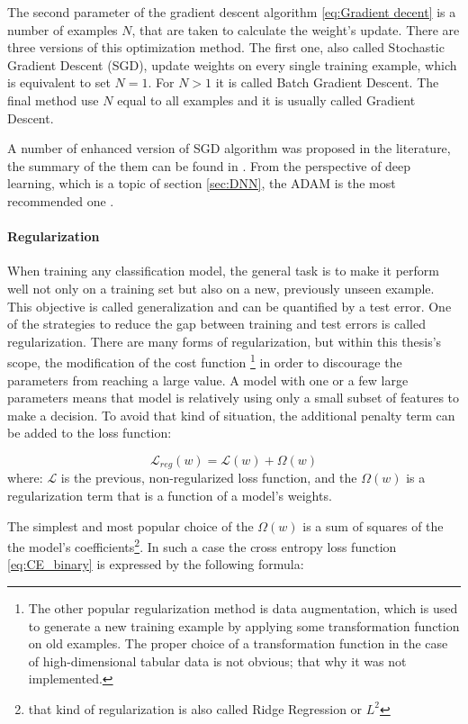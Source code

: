 The second parameter of the gradient descent algorithm \ref{eq:Gradient decent} is a number of examples $N$, that are taken to calculate the weight's update. There are three versions of this optimization method. The first one, also called Stochastic Gradient Descent (SGD), update weights on every single training example, which is equivalent to set $N=1$. For $N>1$ it is called Batch Gradient Descent. The final method use $N$ equal to all examples and it is usually called Gradient Descent.    

A number of enhanced version of SGD algorithm was proposed in the literature, the summary of the them can be found in \cite{GradientDescent}. 
From the perspective of deep learning, which is a topic of section \ref{sec:DNN}, the ADAM is the most recommended one \cite{ADAM}. 

\paragraph{Regularization} \mbox{}


When training any classification model, the general task is to make it perform well not only on a training set but also on a new, previously unseen example. This objective is called generalization and can be quantified by a test error. One of the strategies to reduce the gap between training and test errors is called regularization. There are many forms of regularization, but within this thesis's scope, the modification of the cost function \footnote{The other popular regularization method is data augmentation, which is used to generate a new training example by applying some transformation function on old examples. The proper choice of a transformation function in the case of high-dimensional tabular data is not obvious; that why it was not implemented.} in order to discourage the parameters from reaching a large value. A model with one or a few large parameters means that model is relatively using only a small subset of features to make a decision. To avoid that kind of situation, the additional penalty term can be added to the loss function: 

\begin{equation}
    \mathcal{L}_{reg}(w) = \mathcal{L}(w) + \Omega(w) 
\end{equation}
where: $\mathcal{L}$ is the previous, non-regularized loss function, and the $\Omega(w)$ is a regularization term that is a function of a model's weights. 

The simplest and most popular choice of the $\Omega(w)$ is a sum of squares of the the model's coefficients\footnote{that kind of regularization is also called Ridge Regression or $L^2$}. In such a case the cross entropy loss function \ref{eq:CE_binary} is expressed by the following formula:

